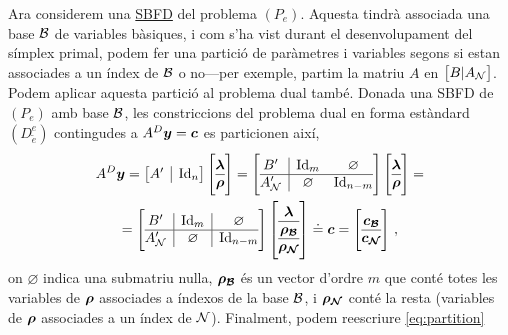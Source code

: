 Ara considerem una \hyperref[defi:SBFD]{SBFD} del problema $(P_e)$. Aquesta
tindrà associada una base $\mathcal{B}$ de variables bàsiques, i com s'ha vist durant
el desenvolupament del símplex primal, podem fer una partició de paràmetres i
variables segons si estan associades a un índex de $\mathcal{B}$ o no---per exemple,
partim la matriu $A$ en $\left[B\vert A_{\mathcal{N}}\right]$. Podem aplicar aquesta
partició al problema dual també. Donada una SBFD de $(P_e)$ amb base $\mathcal{B}$, les
constriccions del problema dual en forma estàndard $(D^e_{\tilde{e}})$
contingudes a $A^D\boldsymbol{y} = \boldsymbol{c}$ es particionen així,
\begin{multline}\label{eq:partition}
A^D\vb{y} =
\left[\begin{array}{{@{}c|c@{}}}
A' & \Id_n
\end{array}\right]
\left[\begin{array}{{@{}c@{}}}
\vb{\lambda}\\
\hline
\vb{\rho}
\end{array}\right] 
=
\left[\begin{array}{{@{}c|cc@{}}}
B'		& \Id_m 		  &	\varnothing	\\
\hline
A_\N' 	& \varnothing & \Id_{n-m}
\end{array}\right]
\left[\begin{array}{{@{}c@{}}}
\vb{\lambda}\\
\hline
\vb{\rho}
\end{array}\right] 
=\\
=
\left[\begin{array}{{@{}c|c|c@{}}}
B'		& \Id_m 		  &	\varnothing	\\
\hline
A_\N' 	& \varnothing & \Id_{n-m}
\end{array}\right]
\left[\begin{array}{{@{}c@{}}}
\vb{\lambda}\\
\hline
\vb{\rho_\B}\\
\hline
\vb{\rho_\N}
\end{array}\right]
\doteq \vb{c}
=
\left[\begin{array}{{@{}c@{}}}
\vb{c_\B}\\
\hline
\vb{c_\N}
\end{array}\right]\,,
\end{multline}
on $\varnothing$ indica una submatriu nul\lgem la, $\boldsymbol{\rho_{\mathcal{B}}}$ és un vector
d'ordre $m$ que conté totes les variables de $\boldsymbol{\rho}$ associades a índexos de
la base $\mathcal{B}$, i $\boldsymbol{\rho_{\mathcal{N}}}$ conté la resta (variables de $\boldsymbol{\rho}$
associades a un índex de $\mathcal{N}$). Finalment, podem reescriure \eqref{eq:partition}
